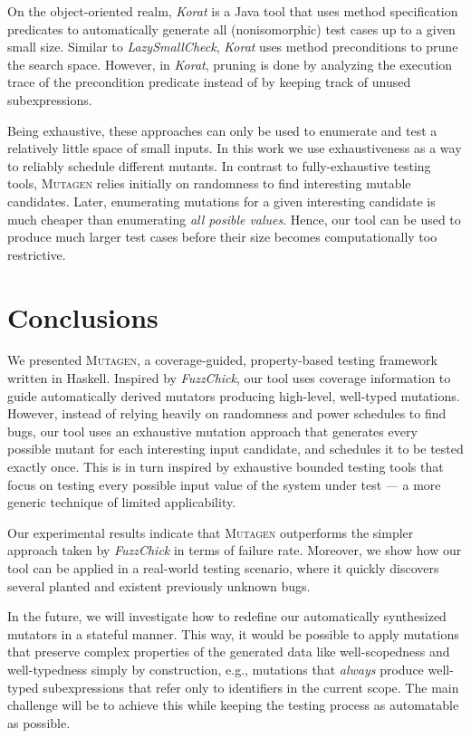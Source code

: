 \documentclass[acmsmall, anonymous]{acmart}
\newcommand{\fuzzchick}{\textit{FuzzChick}\xspace}
\newcommand{\mutagen}{\textsc{Mutagen}\xspace}
\begin{document}
On the object-oriented realm, \emph{Korat} \cite{korat} is a Java tool that uses
method specification predicates to automatically generate all (nonisomorphic)
test cases up to a given small size.
%
Similar to \emph{LazySmallCheck}, \emph{Korat} uses method preconditions to
prune the search space.
%
However, in \emph{Korat}, pruning is done by analyzing the execution trace of
the precondition predicate instead of by keeping track of unused subexpressions.


Being exhaustive, these approaches can only be used to enumerate and test a
relatively little space of small inputs.
%
In this work we use exhaustiveness as a way to reliably schedule different
mutants.
%
In contrast to fully-exhaustive testing tools, \mutagen relies initially on
randomness to find interesting mutable candidates.
%
Later, enumerating mutations for a given interesting candidate is much cheaper
than enumerating \emph{all posible values}.
%
Hence, our tool can be used to produce much larger test cases before their size
becomes computationally too restrictive.




\section{Conclusions}
\label{sec:conclusions}

We presented \mutagen, a coverage-guided, property-based testing framework
written in Haskell.
%
Inspired by \fuzzchick, our tool uses coverage information to guide
automatically derived mutators producing high-level, well-typed mutations.
%
However, instead of relying heavily on randomness and power schedules to find
bugs, our tool uses an exhaustive mutation approach that generates every
possible mutant for each interesting input candidate, and schedules it to be
tested exactly once.
%
This is in turn inspired by exhaustive bounded testing tools that focus on
testing every possible input value of the system under test --- a more generic
technique of limited applicability.


Our experimental results indicate that \mutagen outperforms the simpler approach
taken by \fuzzchick in terms of failure rate.
%
Moreover, we show how our tool can be applied in a real-world testing scenario,
where it quickly discovers several planted and existent previously unknown bugs.


In the future, we will investigate how to redefine our automatically synthesized
mutators in a stateful manner.
%
This way, it would be possible to apply mutations that preserve complex
properties of the generated data like well-scopedness and well-typedness simply
by construction, e.g., mutations that \emph{always} produce well-typed
subexpressions that refer only to identifiers in the current scope.
%
The main challenge will be to achieve this while keeping the testing process as
automatable as possible.
\end{document}

